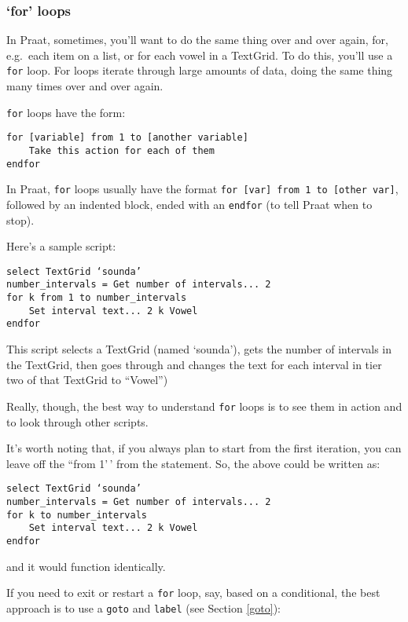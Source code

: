 \hypertarget{for-loops}{%
\subsubsection{`for' loops}\label{for-loops}}

\label{forloops}

In Praat, sometimes, you'll want to do the same thing over and over
again, for, e.g.~each item on a list, or for each vowel in a TextGrid.
To do this, you'll use a \texttt{for} loop. For loops iterate through
large amounts of data, doing the same thing many times over and over
again.

\texttt{for} loops have the form:

\begin{verbatim}
for [variable] from 1 to [another variable]
    Take this action for each of them
endfor
\end{verbatim}

In Praat, \texttt{for} loops usually have the format
\texttt{for [var] from 1 to [other var]}, followed by an indented block,
ended with an \texttt{endfor} (to tell Praat when to stop).

Here's a sample script:

\begin{verbatim} 
select TextGrid ‘sounda’
number_intervals = Get number of intervals... 2
for k from 1 to number_intervals
    Set interval text... 2 k Vowel
endfor
\end{verbatim}

This script selects a TextGrid (named `sounda'), gets the number of
intervals in the TextGrid, then goes through and changes the text for
each interval in tier two of that TextGrid to ``Vowel'')

Really, though, the best way to understand \texttt{for} loops is to see
them in action and to look through other scripts.

It's worth noting that, if you always plan to start from the first
iteration, you can leave off the ``from 1'\,' from the statement. So,
the above could be written as:

\begin{verbatim} 
select TextGrid ‘sounda’
number_intervals = Get number of intervals... 2
for k to number_intervals
    Set interval text... 2 k Vowel
endfor
\end{verbatim}

and it would function identically.

If you need to exit or restart a \texttt{for} loop, say, based on a
conditional, the best approach is to use a \texttt{goto} and
\texttt{label} (see Section \ref{goto}):

